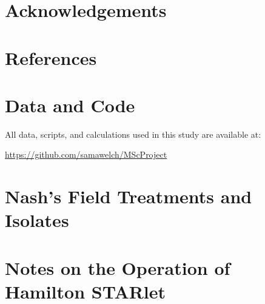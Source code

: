 \documentclass[final,1p,times]{elsarticle}
\begin{document}
\section{Acknowledgements}
\label{S:6}



\section{References}
\label{S:7}


\begin{appendices}

\section{Data and Code}
\label{A:1}

All data, scripts, and calculations used in this study are available at: 

\url{https://github.com/samawelch/MScProject}

\section{Nash's Field Treatments and Isolates}
\label{A:2}


\section{Notes on the Operation of Hamilton STARlet}
\label{A:3}
\end{appendices}
\end{document}
